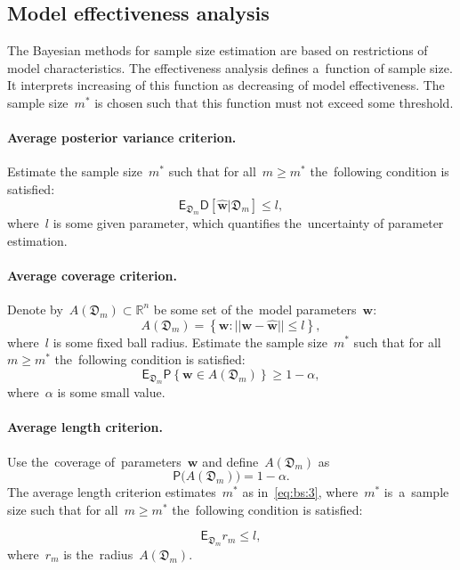 \documentclass[
11pt,%
tightenlines,%
twoside,%
onecolumn,%
nofloats,%
nobibnotes,%
nofootinbib,%
superscriptaddress,%
noshowpacs,%
centertags]%
{revtex4}
\begin{document}
\subsection{Model effectiveness analysis}
The Bayesian methods for sample size estimation are based on restrictions of model characteristics. The effectiveness analysis defines a~function of sample size. It interprets increasing of this function as decreasing of model effectiveness. The sample size~$m^*$ is chosen such that this function must not exceed some threshold.

\paragraph{Average posterior variance criterion.}
Estimate the sample size~$m^*$ such that for all~$m \geq m^*$ the~following condition is satisfied:
\[
\label{eq:bs:1}
	\mathsf{E}_{\mathfrak{D}_m}\mathsf{D}\left[\hat{\mathbf{w}}|\mathfrak{D}_m\right] \leq l,
\]
where~$l$ is some given parameter, which quantifies the~uncertainty of parameter estimation.

\paragraph{Average coverage criterion.}
Denote by~$A\left(\mathfrak{D}_{m}\right) \subset \mathbb{R}^n$ be some set of the~model parameters~$\mathbf{w}$:
\[
\label{eq:bs:2}
	A\left(\mathfrak{D}_{m}\right) = \left\{\mathbf{w}:||\mathbf{w} - \hat{\mathbf{w}}||\leq l\right\},
\]
where~$l$ is some fixed ball radius. Estimate the sample size~$m^*$ such that for all~$m \geq m^*$ the~following condition is satisfied:
\[
\label{eq:bs:3}
	\mathsf{E}_{\mathfrak{D}_m}\mathsf{P}\left\{\mathbf{w} \in A\left(\mathfrak{D}_m\right)\right\} \geq 1-\alpha,
\]
where~$\alpha$ is some small value.
	
\paragraph{Average length criterion.}
Use the~coverage of~parameters~$\mathbf{w}$ and define~$A\left(\mathfrak{D}_{m}\right)$ as
\[
\label{eq:bs:4}
	\mathsf{P}\bigl(A\left(\mathfrak{D}_{m}\right)\bigr) = 1- \alpha.
\]
The average length criterion estimates~$m^*$ as in~\eqref{eq:bs:3}, where~$m^*$ is~a~sample size such that for all~$m \geq m^*$ the~following condition is satisfied:
	
\[
\label{eq:bs:5}
	\mathsf{E}_{\mathfrak{D}_m}r_m\leq l,
\]
where~$r_m$ is the~radius~$A\left(\mathfrak{D}_{m}\right)$.
\end{document}
